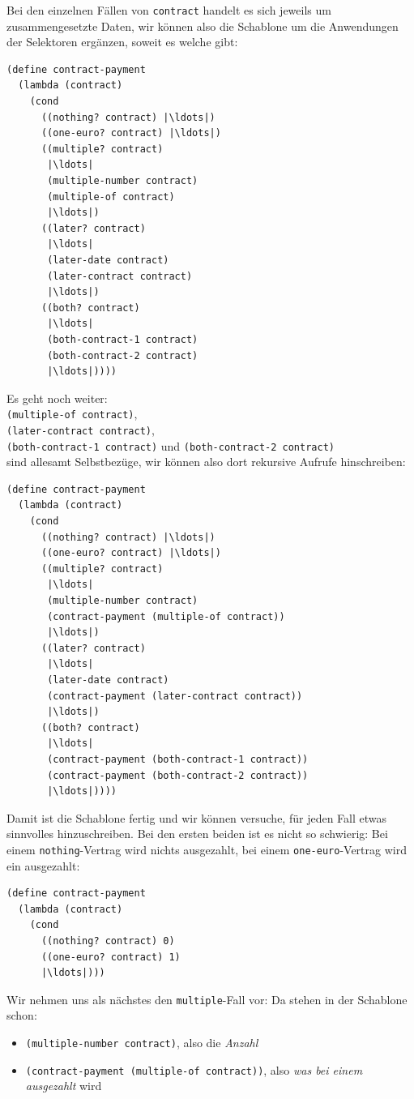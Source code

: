 %
Bei den einzelnen Fällen von \lstinline{contract} handelt es sich
jeweils um zusammengesetzte Daten, wir können also die Schablone um
die Anwendungen der Selektoren ergänzen, soweit es welche gibt:
%
\begin{lstlisting}
(define contract-payment
  (lambda (contract)
    (cond
      ((nothing? contract) |\ldots|)
      ((one-euro? contract) |\ldots|)
      ((multiple? contract)
       |\ldots|
       (multiple-number contract)
       (multiple-of contract)
       |\ldots|)
      ((later? contract)
       |\ldots|
       (later-date contract)
       (later-contract contract)
       |\ldots|)
      ((both? contract)
       |\ldots|
       (both-contract-1 contract)
       (both-contract-2 contract)
       |\ldots|))))
\end{lstlisting}
%
Es geht noch weiter:\\
\lstinline{(multiple-of contract)},\\
\lstinline{(later-contract contract)},\\
\lstinline{(both-contract-1 contract)}  und \lstinline{(both-contract-2 contract)} \\
sind allesamt
Selbstbezüge, wir können also dort rekursive Aufrufe hinschreiben:
%
\begin{lstlisting}
(define contract-payment
  (lambda (contract)
    (cond
      ((nothing? contract) |\ldots|)
      ((one-euro? contract) |\ldots|)
      ((multiple? contract)
       |\ldots|
       (multiple-number contract)
       (contract-payment (multiple-of contract))
       |\ldots|)
      ((later? contract)
       |\ldots|
       (later-date contract)
       (contract-payment (later-contract contract))
       |\ldots|)
      ((both? contract)
       |\ldots|
       (contract-payment (both-contract-1 contract))
       (contract-payment (both-contract-2 contract))
       |\ldots|))))
\end{lstlisting}
%
Damit ist die Schablone fertig und wir können versuche, für jeden Fall
etwas sinnvolles hinzuschreiben.  Bei den ersten beiden ist es nicht
so schwierig: Bei einem \lstinline{nothing}-Vertrag wird nichts
ausgezahlt, bei einem \lstinline{one-euro}-Vertrag wird ein 
ausgezahlt:
%
\begin{lstlisting}
(define contract-payment
  (lambda (contract)
    (cond
      ((nothing? contract) 0)
      ((one-euro? contract) 1)
      |\ldots|)))
\end{lstlisting}
%
Wir nehmen uns als nächstes den \lstinline{multiple}-Fall vor: Da
stehen in der Schablone schon:
\begin{itemize}
\item\lstinline{(multiple-number contract)}, also die \emph{Anzahl}
\item\lstinline{(contract-payment (multiple-of contract))}, also
  \emph{was bei einem ausgezahlt} wird
\end{itemize}
